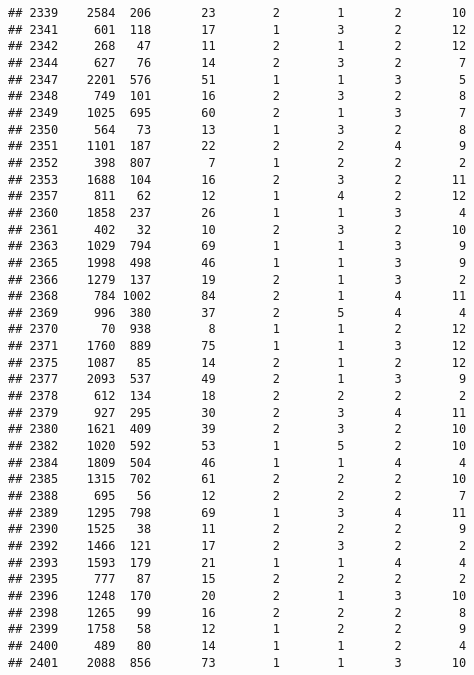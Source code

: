\documentclass[]{article}
\begin{document}
\begin{verbatim}
## 2339    2584  206       23        2        1       2       10
## 2341     601  118       17        1        3       2       12
## 2342     268   47       11        2        1       2       12
## 2344     627   76       14        2        3       2        7
## 2347    2201  576       51        1        1       3        5
## 2348     749  101       16        2        3       2        8
## 2349    1025  695       60        2        1       3        7
## 2350     564   73       13        1        3       2        8
## 2351    1101  187       22        2        2       4        9
## 2352     398  807        7        1        2       2        2
## 2353    1688  104       16        2        3       2       11
## 2357     811   62       12        1        4       2       12
## 2360    1858  237       26        1        1       3        4
## 2361     402   32       10        2        3       2       10
## 2363    1029  794       69        1        1       3        9
## 2365    1998  498       46        1        1       3        9
## 2366    1279  137       19        2        1       3        2
## 2368     784 1002       84        2        1       4       11
## 2369     996  380       37        2        5       4        4
## 2370      70  938        8        1        1       2       12
## 2371    1760  889       75        1        1       3       12
## 2375    1087   85       14        2        1       2       12
## 2377    2093  537       49        2        1       3        9
## 2378     612  134       18        2        2       2        2
## 2379     927  295       30        2        3       4       11
## 2380    1621  409       39        2        3       2       10
## 2382    1020  592       53        1        5       2       10
## 2384    1809  504       46        1        1       4        4
## 2385    1315  702       61        2        2       2       10
## 2388     695   56       12        2        2       2        7
## 2389    1295  798       69        1        3       4       11
## 2390    1525   38       11        2        2       2        9
## 2392    1466  121       17        2        3       2        2
## 2393    1593  179       21        1        1       4        4
## 2395     777   87       15        2        2       2        2
## 2396    1248  170       20        2        1       3       10
## 2398    1265   99       16        2        2       2        8
## 2399    1758   58       12        1        2       2        9
## 2400     489   80       14        1        1       2        4
## 2401    2088  856       73        1        1       3       10

\end{verbatim}
\end{document}
